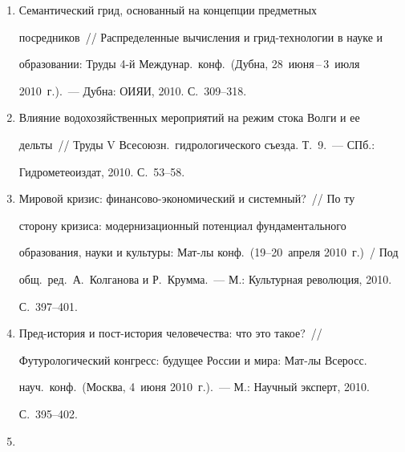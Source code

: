 \begin{enumerate}[1.]
посредников~/\!\!/  Электронные библиотеки: перспективные методы и 


технологии, электронные коллекции (RCDL'2010): Труды XII Всеросс.\ науч.\ 


конф.\ (Казань, 13--17~октября 2010~г.).~--- Казань: КГУ, 2010. С.~273--278.


\item {}


Семантический грид, основанный на концепции предметных 


посредников~/\!\!/  Распределенные вычисления и грид-технологии в науке и 


образовании: Труды 4-й Междунар.\ конф.\ (Дубна, 28~июня\,--\,3~июля 


2010~г.).~--- Дубна: ОИЯИ, 2010. С.~309--318.


\item {}


Влияние водохозяйственных мероприятий на режим стока Волги и ее 


дельты~/\!\!/  Труды V Всесоюзн.\ гидрологического съезда. Т.~9.~--- СПб.: 


Гидрометеоиздат, 2010. С.~53--58.





\item {}


Мировой кризис: финансово-экономический и сис\-темный?~/\!\!/  По ту 


сторону кризиса: модернизационный потенциал фундаментального 


образования, науки и культуры: Мат-лы конф.\ (19--20~апреля 2010~г.)~/ Под 


общ.\ ред.\ А.~Колганова и Р.~Крумма.~--- М.: Культурная революция, 2010. 


С.~397--401.


\item {}


Пред-история и пост-история человечества: что это такое?~/\!\!/  


Футурологический конгресс: будущее России и мира: Мат-лы Всеросс.\ 


науч.\ конф.\ (Москва, 4~июня 2010~г.).~--- М.: Научный эксперт, 2010. 


С.~395--402.





\item {}



\end{enumerate}
